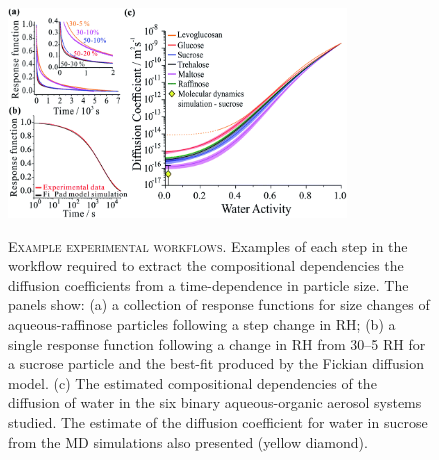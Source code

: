 \begin{figure}
    \centering
    \caption[Example experimental workflows]{\textsc{Example experimental workflows}. Examples of each step in the workflow required to extract the compositional dependencies the diffusion coefficients from a time-dependence in particle size. The panels show: (a) a collection of response functions for size changes of aqueous-raffinose particles following a step change in RH; (b) a single response function following a change in RH from \numrange{30}{5} RH for a sucrose particle and the best-fit produced by the Fickian diffusion model. (c) The estimated compositional dependencies of the diffusion of water in the six binary aqueous-organic aerosol systems studied. The estimate of the diffusion coefficient for water in sucrose from the MD simulations also presented (yellow diamond).}
    \includegraphics[width=0.8\textwidth]{chapters/water_hopping/figures/f1.png}
    \label{fig:wat_f1}
\end{figure}

